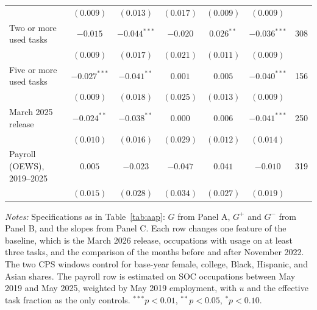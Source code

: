 \documentclass[12pt]{article}
\theoremstyle{plain}
\theoremstyle{definition}
\theoremstyle{remark}
\begin{document}
\begin{table}[p]
\begin{tabular}{@{}lcccccc@{}}
 & $(0.009)$ & $(0.013)$ & $(0.017)$ & $(0.009)$ & $(0.009)$ & \\
Two or more used tasks & $-0.015$ & $-0.044^{***}$ & $-0.020$ & $0.026^{**}$ & $-0.036^{***}$ & 308 \\
 & $(0.009)$ & $(0.017)$ & $(0.021)$ & $(0.011)$ & $(0.009)$ & \\
Five or more used tasks & $-0.027^{***}$ & $-0.041^{**}$ & $0.001$ & $0.005$ & $-0.040^{***}$ & 156 \\
 & $(0.009)$ & $(0.018)$ & $(0.025)$ & $(0.013)$ & $(0.009)$ & \\
March 2025 release & $-0.024^{**}$ & $-0.038^{**}$ & $0.000$ & $0.006$ & $-0.041^{***}$ & 250 \\
 & $(0.010)$ & $(0.016)$ & $(0.029)$ & $(0.012)$ & $(0.014)$ & \\
Payroll (OEWS), 2019--2025 & $0.005$ & $-0.023$ & $-0.047$ & $0.041$ & $-0.010$ & 319 \\
 & $(0.015)$ & $(0.028)$ & $(0.034)$ & $(0.027)$ & $(0.019)$ & \\
\bottomrule
\end{tabular}

\smallskip
\begin{minipage}{\linewidth}\footnotesize
\emph{Notes:} Specifications as in Table~\ref{tab:aap}: $G$ from Panel A,
$G^{+}$ and $G^{-}$ from Panel B, and the slopes from Panel C. Each row
changes one feature of the baseline, which is the March 2026 release,
occupations with usage on at least three tasks, and the comparison of the
months before and after November 2022. The two CPS windows control for
base-year female, college, Black, Hispanic, and Asian shares. The payroll
row is estimated on SOC occupations between May 2019 and May 2025,
weighted by May 2019 employment, with $u$ and the effective task fraction
as the only controls. $^{***}p<0.01$, $^{**}p<0.05$, $^{*}p<0.10$.
\end{minipage}
\end{table}
\end{document}
